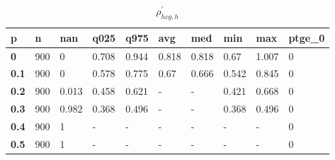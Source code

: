 \begin{table}[h]
 \centering 
\footnotesize
\caption{$\rho_{hcg,h}^\prime $}
\label{tab:alphahcgh}
\begin{tabular}[h]{|l|l|l|l|l|l|l|l|l|l|
    } \hline
\textbf{ p} & \textbf{ n} & \textbf{ nan} & \textbf{ q025} & \textbf{ q975} & \textbf{ avg} & \textbf{ med} & \textbf{ min} & \textbf{ max} & \textbf{ ptge\_0}
    \\ \hline
  \textbf{  0} & 900 &     0 & 0.708 & 0.944 & 0.818 & 0.818 &  0.67 & 1.007 & 0
    \\ \hline
  \textbf{0.1} & 900 &     0 & 0.578 & 0.775 &  0.67 & 0.666 & 0.542 & 0.845 & 0
    \\ \hline
  \textbf{0.2} & 900 & 0.013 & 0.458 & 0.621 & - & - & 0.421 & 0.668 & 0
    \\ \hline
  \textbf{0.3} & 900 & 0.982 & 0.368 & 0.496 & - & - & 0.368 & 0.496 & 0
    \\ \hline
  \textbf{0.4} & 900 &     1 & - & - & - & - & - & - & 0
    \\ \hline
  \textbf{0.5} & 900 &     1 & - & - & - & - & - & - & 0
    \\ \hline
 \end{tabular}
 \end{table}
